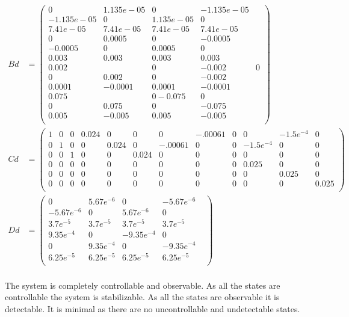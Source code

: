 \documentclass[]{article}
\begin{document}
\begin{align*}
Bd &= \begin{pmatrix}
0 &	1.135e-05	&0	&-1.135e-05 \\
-1.135e-05	&0	&1.135e-05&	0 \\
7.41e-05 &	7.41e-05 &	7.41e-05&	7.41e-05 \\
0	&0.0005&	0&	-0.0005\\
-0.0005&	0&	0.0005&	0&\\
0.003&0.003&0.003&	0.003 \\
0.002 &	&0&	-0.002	&0 \\
0	&0.002 &	0	&-0.002 \\
0.0001&	-0.0001&	0.0001&	-0.0001 \\
0.075&&	0	-0.075&	0& \\
0	&0.075&	0&	-0.075& \\
0.005&	-0.005&	0.005&	-0.005 \\
\end{pmatrix} \\
Cd &= \begin{pmatrix}
1& 0& 0& 0.024& 0& 0& 0& -.00061& 0& 0& -1.5e^{-4}& 0 \\
0& 1& 0& 0& 0.024& 0& -.00061& 0& 0& -1.5e^{-4}& 0 & 0 \\
0& 0& 1& 0& 0& 0.024& 0& 0& 0& 0& 0& 0 \\
0& 0& 0& 0& 0& 0& 0& 0& 0& 0.025& 0& 0 \\
0& 0& 0& 0& 0& 0& 0& 0& 0& 0& 0.025& 0 \\
0& 0& 0& 0& 0& 0& 0& 0& 0& 0& 0& 0.025 \\
\end{pmatrix} \\
Dd &=\begin{pmatrix}
0& 5.67e^{-6}& 0& -5.67e^{-6}& \\
-5.67e^{-6}& 0& 5.67e^{-6}& 0& \\
3.7e^{-5}& 3.7e^{-5}& 3.7e^{-5}& 3.7e^{-5}& \\
9.35e^{-4}& 0& -9.35e^{-4}& 0& \\
0& 9.35e^{-4}& 0& -9.35e^{-4}& \\
6.25e^{-5}& 6.25e^{-5}& 6.25e^{-5}& 6.25e^{-5}& \\
\end{pmatrix}\\
\end{align*}

The system is completely controllable and observable. As all the states are controllable the system is stabilizable. As all the states are observable it is detectable. It is minimal as there are no uncontrollable and undetectable states. 
\end{document}
